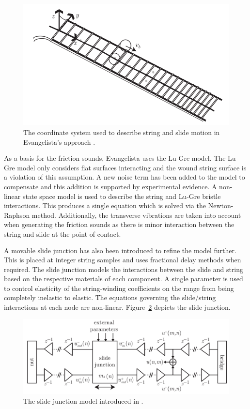 \documentclass[main.tex]{subfiles}
\begin{document}
\begin{figure}[h]
    \centering
    \includegraphics[scale=.65]{./images/diagrams/EvangelistaCoordinateSystem.png}
    \caption{The coordinate system used to describe string and slide motion in Evangelista's approach .}
    \label{fig:EvangelistaCoordinateSystem}
\end{figure}

As a basis for the friction sounds, Evangelista uses the Lu-Gre model. The Lu-Gre model only considers flat surfaces interacting and the wound string surface is a violation of this assumption. A new noise term has been added to the model to compensate and this addition is supported by experimental evidence. A non-linear state space model is used to describe the string and Lu-Gre bristle interactions. This produces a single equation which is solved via the Newton-Raphson method. Additionally, the transverse vibrations are taken into account when generating the friction sounds as there is minor interaction between the string and slide at the point of contact. 

A movable slide junction has also been introduced to refine the model further. This is placed at integer string samples and uses fractional delay methods when required. The slide junction models the interactions between the slide and string based on the respective materials of each component. A single parameter is used to control elasticity of the string-winding coefficients on the range from being completely inelastic to elastic. The equations governing the slide/string interactions at each node are non-linear. Figure~\ref{fig:EvangelistaSlideJunction} depicts the slide junction.

\begin{figure}[h]
    \centering
    \includegraphics[scale=.5]{./images/diagrams/EvangelistaSlideJunction.png}
    \caption{The slide junction model introduced in .}
    \label{fig:EvangelistaSlideJunction}
\end{figure}
\end{document}
